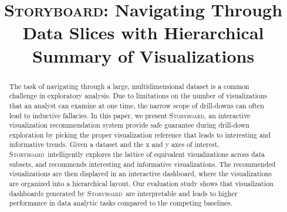 \documentclass[sigchi]{acmart}
\newcommand{\system}{\textsc{Storyboard}\xspace}
\def\plainauthor{Doris Jung-Lin Lee*, Himel Dev*, Huizi Hu, Hazem Elmeleegy, Aditya Parameswaran}
\begin{document}
\title{\system : Navigating Through Data Slices with Hierarchical Summary of Visualizations}
\begin{abstract}
The task of navigating through a large, multidimensional dataset is a common challenge in exploratory analysis. Due to limitations on the number of visualizations that an analyst can examine at one time, the narrow scope of drill-downs can often lead to inductive fallacies. %
In this paper, we present \system, an interactive visualization recommendation system provide safe guarantee during drill-down exploration by picking the proper visualization reference that leads to interesting and informative trends. Given a dataset and the x and y axes of interest, \system\ intelligently explores the lattice of equivalent visualizations across data subsets, and recommends interesting and informative visualizations. The recommended visualizations are then displayed in an interactive dashboard, where the visualizations are organized into a hierarchical layout. Our evaluation study shows that visualization dashboards generated by \system\ are interpretable and leads to higher performance in data analytic tasks compared to the competing baselines.
\end{abstract}

\maketitle




 \newpage
 
 
% 
% 
% 



\end{document}
